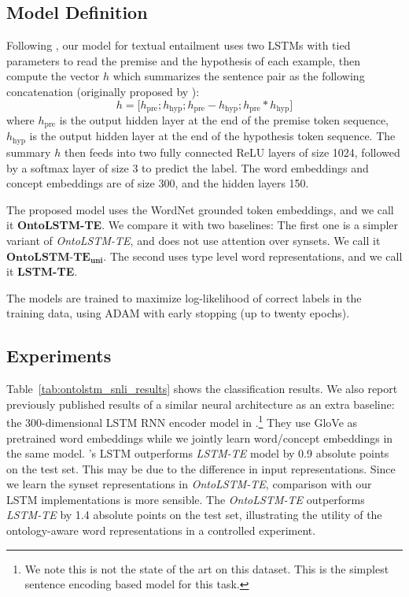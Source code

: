 \subsection{Model Definition}
Following \cite{bowman2016fast}, our model for textual entailment uses two LSTMs with tied parameters
to  read the premise and the hypothesis of each example, then compute the vector $h$ 
which summarizes the sentence pair as the following concatenation (originally proposed by \cite{mou2015recognizing}):
$$h=\big[h_{\text{pre}}; h_{\text{hyp}}; h_{\text{pre}} 
-h_{\text{hyp}};h_{\text{pre}} *h_{\text{hyp}}\big]$$
where $h_\text{pre}$ is the output hidden layer at the end of the premise token 
sequence, $h_\text{hyp}$ is the output hidden layer at the end of the hypothesis 
token sequence.
The summary $h$ then feeds into two fully connected ReLU layers of size 1024, 
followed by a softmax layer of size 3 to predict the label.
The word embeddings and concept embeddings are of size 300, and the hidden 
layers 150.

The proposed model uses the WordNet grounded token embeddings, and we call it \textbf{OntoLSTM-TE}.
We compare it with two baselines: The first one is a simpler variant of \textit{OntoLSTM-TE}, and does not
use attention over synsets. We call it $\textbf{OntoLSTM-TE}_{\textbf{uni}}$. The second uses type level word representations, and 
we call it \textbf{LSTM-TE}.

The models are trained to maximize log-likelihood of correct labels in the 
training data, using ADAM \citep{kingma2014adam} with early stopping (up to 
twenty epochs).

\subsection{Experiments}
\label{sec:ontolstm_snli_results}
Table~\ref{tab:ontolstm_snli_results} shows the classification results. We also 
report previously published results of a similar neural architecture as an extra 
baseline: the 300-dimensional LSTM RNN encoder model in 
\cite{bowman2016fast}.\footnote{We note this is not the state of the art
on this dataset. This is the simplest sentence encoding based model for this task.}
They use GloVe as pretrained word embeddings while we jointly learn word/concept 
embeddings in the same model.
\cite{bowman2016fast}'s LSTM outperforms \textit{LSTM-TE} model by 0.9 absolute points 
on the test set. This may be due to the difference in input representations. 
Since we learn the synset representations in \textit{OntoLSTM-TE}, comparison with our LSTM 
implementations is more sensible.
The \textit{OntoLSTM-TE} outperforms \textit{LSTM-TE} by 1.4 absolute 
points on the test set, illustrating the utility of the ontology-aware word 
representations in a controlled experiment.


